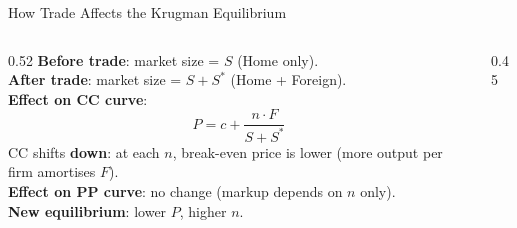 \documentclass[aspectratio=169]{beamer}
\begin{document}
\begin{frame}{How Trade Affects the Krugman Equilibrium}
\begin{columns}
\begin{column}{0.52\textwidth}
\textbf{Before trade}: market size = $S$ (Home only).\\[0.3em]
\textbf{After trade}: market size = $S + S^*$ (Home + Foreign).\\[0.3em]
\textbf{Effect on CC curve}:
\[P = c + \frac{n \cdot F}{S + S^*}\]
CC shifts \textbf{down}: at each $n$, break-even price is lower (more output per firm amortises $F$).\\[0.3em]
\textbf{Effect on PP curve}: no change (markup depends on $n$ only).\\[0.3em]
\textbf{New equilibrium}: lower $P$, higher $n$.
\end{column}
\begin{column}{0.45\textwidth}
\end{column}
\end{columns}
\end{frame}
\end{document}
